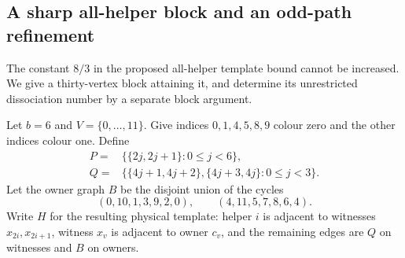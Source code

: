 \subsection{A sharp all-helper block and an odd-path refinement}

The constant $8/3$ in the proposed all-helper template bound cannot be
increased. We give a thirty-vertex block attaining it, and determine its
unrestricted dissociation number by a separate block argument.

Let $b=6$ and $V=\{0,\ldots,11\}$. Give indices $0,1,4,5,8,9$ colour zero
and the other indices colour one. Define
\begin{align*}
 P={}&\{\{2j,2j+1\}:0\le j<6\},\\
 Q={}&\{\{4j+1,4j+2\},\{4j+3,4j\}:0\le j<3\}.
\end{align*}
Let the owner graph $B$ be the disjoint union of the cycles
\[
 (0,10,1,3,9,2,0),\qquad(4,11,5,7,8,6,4).
\]
Write $H$ for the resulting physical template: helper $i$ is adjacent to
witnesses $x_{2i},x_{2i+1}$, witness $x_v$ is adjacent to owner $c_v$,
and the remaining edges are $Q$ on witnesses and $B$ on owners.


